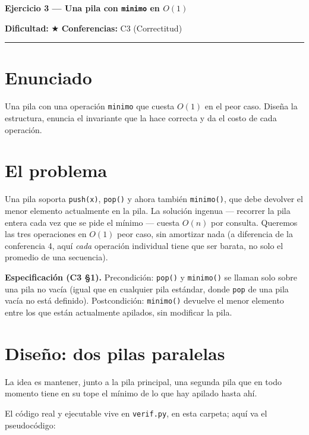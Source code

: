 \documentclass[11pt]{article}
\begin{document}
{\LARGE\bfseries\color{azultitulo} Ejercicio 3 --- Una pila con \texttt{minimo} en $O(1)$}

\vspace{2pt}
\textbf{Dificultad:} $\bigstar$ \quad \textbf{Conferencias:} C3 (Correctitud)
\vspace{8pt}
\hrule
\vspace{12pt}

\section*{Enunciado}
\begin{enunciado}
Una pila con una operación \texttt{minimo} que cuesta $O(1)$ en el peor caso. Diseña la estructura,
enuncia el invariante que la hace correcta y da el costo de cada operación.
\end{enunciado}

\section{El problema}

Una pila soporta \texttt{push(x)}, \texttt{pop()} y ahora también \texttt{minimo()}, que debe devolver el
menor elemento actualmente en la pila. La solución ingenua --- recorrer la pila entera cada vez que se pide
el mínimo --- cuesta $O(n)$ por consulta. Queremos las tres operaciones en $O(1)$ peor caso, sin
amortizar nada (a diferencia de la conferencia 4, aquí \emph{cada} operación individual tiene que ser
barata, no solo el promedio de una secuencia).

\textbf{Especificación (C3 §1).} Precondición: \texttt{pop()} y \texttt{minimo()} se llaman solo sobre una
pila no vacía (igual que en cualquier pila estándar, donde \texttt{pop} de una pila vacía no está
definido). Postcondición: \texttt{minimo()} devuelve el menor elemento entre los que están actualmente
apilados, sin modificar la pila.

\section{Diseño: dos pilas paralelas}

La idea es mantener, junto a la pila principal, una segunda pila que en todo momento tiene en su tope el
mínimo de lo que hay apilado hasta ahí.

El código real y ejecutable vive en \texttt{verif.py}, en esta carpeta; aquí va el pseudocódigo:
\end{document}

